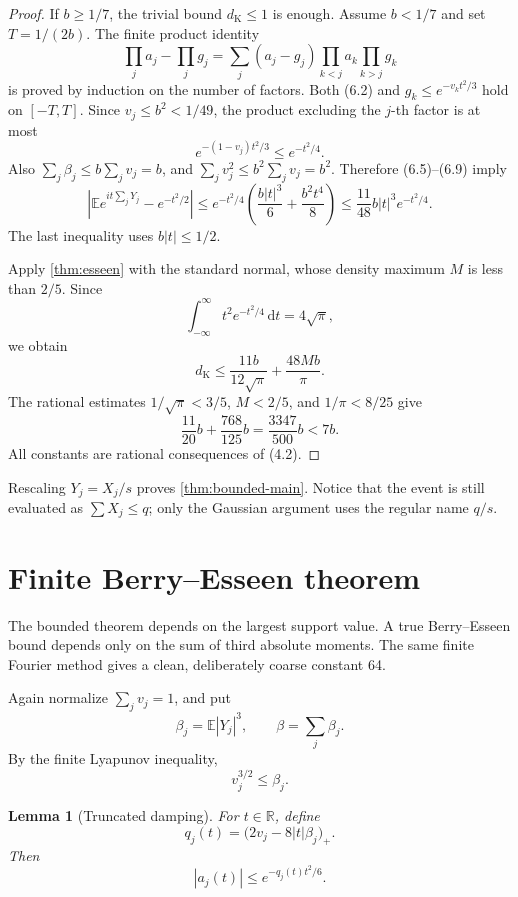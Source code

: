 \documentclass[11pt]{article}
\newtheorem{lemma}[theorem]{Lemma}
\newcommand{\R}{\mathbb R}
\newcommand{\E}{\mathbb E}
\newcommand{\dd}{\,\mathrm d}
\newcommand{\dk}{d_{\mathrm K}}
\newcommand{\abs}[1]{\left|#1\right|}
\begin{document}
\begin{proof}
If \(b\ge1/7\), the trivial bound \(\dk\le1\) is enough.  Assume
\(b<1/7\) and set \(T=1/(2b)\).  The finite product identity
\[
 \prod_ja_j-\prod_jg_j
 =\sum_j(a_j-g_j)\prod_{k<j}a_k\prod_{k>j}g_k         \tag{6.8}
\]
is proved by induction on the number of factors.  Both (6.2) and
\(g_k\le e^{-v_kt^2/3}\) hold on \([-T,T]\).  Since
\(v_j\le b^2<1/49\), the product excluding the \(j\)-th factor is at most
\[
 e^{-(1-v_j)t^2/3}\le e^{-t^2/4}.                     \tag{6.9}
\]
Also \(\sum_j\beta_j\le b\sum_jv_j=b\), and
\(\sum_jv_j^2\le b^2\sum_jv_j=b^2\).  Therefore (6.5)--(6.9) imply
\[
 \abs{\E e^{it\sum_jY_j}-e^{-t^2/2}}
 \le e^{-t^2/4}
       \left(\frac{b|t|^3}{6}+\frac{b^2t^4}{8}\right)
 \le\frac{11}{48}b|t|^3e^{-t^2/4}.                   \tag{6.10}
\]
The last inequality uses \(b|t|\le1/2\).

Apply \cref{thm:esseen} with the standard normal, whose density maximum
\(M\) is less than \(2/5\).  Since
\[
 \int_{-\infty}^{\infty}t^2e^{-t^2/4}\dd t=4\sqrt\pi, \tag{6.11}
\]
we obtain
\[
 \dk\le \frac{11b}{12\sqrt\pi}+\frac{48Mb}{\pi}.     \tag{6.12}
\]
The rational estimates \(1/\sqrt\pi<3/5\), \(M<2/5\), and
\(1/\pi<8/25\) give
\[
 \frac{11}{20}b+\frac{768}{125}b
 =\frac{3347}{500}b<7b.                               \tag{6.13}
\]
All constants are rational consequences of (4.2).
\end{proof}

Rescaling \(Y_j=X_j/s\) proves \cref{thm:bounded-main}.  Notice that the
event is still evaluated as \(\sum X_j\le q\); only the Gaussian argument
uses the regular name \(q/s\).

\section{Finite Berry--Esseen theorem}\label{sec:berry-esseen}

The bounded theorem depends on the largest support value.  A true
Berry--Esseen bound depends only on the sum of third absolute moments.  The
same finite Fourier method gives a clean, deliberately coarse constant 64.

Again normalize \(\sum_jv_j=1\), and put
\[
 \beta_j=\E|Y_j|^3,\qquad \beta=\sum_j\beta_j.         \tag{7.1}
\]
By the finite Lyapunov inequality,
\[
 v_j^{3/2}\le\beta_j.                                  \tag{7.2}
\]

\begin{lemma}[Truncated damping]\label{lem:truncated-damping}
For \(t\in\R\), define
\[
 q_j(t)=\bigl(2v_j-8|t|\beta_j\bigr)_+.               \tag{7.3}
\]
Then
\[
 |a_j(t)|\le e^{-q_j(t)t^2/6}.                         \tag{7.4}
\]
\end{lemma}
\end{document}
